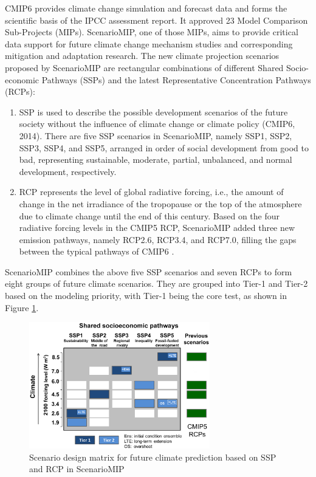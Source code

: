\documentclass[twocolumn, a4paper,10pt]{article}
\begin{document}
CMIP6 provides climate change simulation and forecast data and forms the
scientific basis of the IPCC assessment report. It approved 23 Model Comparison
Sub-Projects (MIPs). ScenarioMIP, one of those MIPs, aims to provide critical
data support for future climate change mechanism studies and corresponding
mitigation and adaptation research. The new climate projection scenarios
proposed by ScenarioMIP are rectangular combinations of different Shared
Socio-economic Pathways (SSPs) and the latest Representative Concentration
Pathways (RCPs):

\begin{enumerate}
\def\labelenumi{\arabic{enumi}.}
\item
  SSP is used to describe the possible development scenarios of the future
  society without the influence of climate change or climate policy (CMIP6,
  2014). There are five SSP scenarios in ScenarioMIP, namely SSP1, SSP2, SSP3,
  SSP4, and SSP5, arranged in order of social development from good to bad,
  representing sustainable, moderate, partial, unbalanced, and normal
  development, respectively.
\item
  RCP represents the level of global radiative forcing, i.e., the amount of
  change in the net irradiance of the tropopause or the top of the atmosphere
  due to climate change until the end of this century. Based on the four
  radiative forcing levels in the CMIP5 RCP, ScenarioMIP added three new
  emission pathways, namely RCP2.6, RCP3.4, and RCP7.0, filling the gaps
  between the typical pathways of CMIP6 \citep{oneill2016scenario}.
\end{enumerate}

ScenarioMIP combines the above five SSP scenarios and seven RCPs to form eight
groups of future climate scenarios. They are grouped into Tier-1 and Tier-2
based on the modeling priority, with Tier-1 being the core test, as shown in
Figure \ref{fig:ssp}.

\begin{figure}
\includegraphics[width=0.7\textwidth]{figures/ssp-hires} \caption{Scenario design matrix for future climate prediction based on SSP  and RCP in ScenarioMIP\citep{oneill2016scenario}}\label{fig:ssp}
\end{figure}
\end{document}

